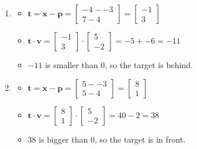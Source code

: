 \documentclass[11pt]{article}
\begin{document}
\begin{enumerate}[a.]
\begin{enumerate}[1.)]
	\item %
	\begin{itemize}
		\item $\textbf{t}=\textbf{x}-\textbf{p}=\begin{bmatrix}
-4 - -3 \\ 7 - 4		
\end{bmatrix}=\begin{bmatrix}
-1 \\ 3	
\end{bmatrix}$
		\item $\textbf{t} \cdot \textbf{v} =
\begin{bmatrix}
-1 \\ 3
\end{bmatrix}\cdot
\begin{bmatrix}
5 \\ -2	
\end{bmatrix}=-5+-6=-11$
		\item $-11$ is smaller than $0$, so the target is behind.
	\end{itemize}
	
	\item %
	\begin{itemize}
		\item $\textbf{t}=\textbf{x}-\textbf{p}=\begin{bmatrix}
5 - -3 \\ 5 - 4		
\end{bmatrix}=\begin{bmatrix}
8 \\ 1
\end{bmatrix}$
		\item $\textbf{t} \cdot \textbf{v} =
\begin{bmatrix}
8 \\ 1
\end{bmatrix}\cdot
\begin{bmatrix}
5 \\ -2	
\end{bmatrix}=40-2=38$
		\item $38$ is bigger than $0$, so the target is in front.
	\end{itemize}
	

\end{enumerate}
\end{enumerate}
\end{document}
